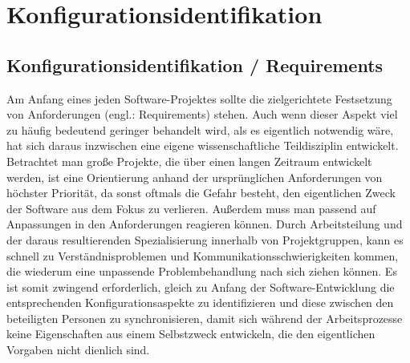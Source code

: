 \chapter{Konfigurationsidentifikation}
\section{Konfigurationsidentifikation / Requirements}
Am Anfang eines jeden Software-Projektes sollte die zielgerichtete Festsetzung von Anforderungen (engl.: Requirements) stehen. Auch wenn dieser Aspekt viel zu häufig bedeutend geringer behandelt wird, als es eigentlich notwendig wäre, hat sich daraus inzwischen eine eigene wissenschaftliche Teildisziplin entwickelt. Betrachtet man große Projekte, die über einen langen Zeitraum entwickelt werden, ist eine Orientierung anhand der ursprünglichen Anforderungen von höchster Priorität, da sonst oftmals die Gefahr besteht, den eigentlichen Zweck der Software aus dem Fokus zu verlieren. Außerdem muss man passend auf Anpassungen in den Anforderungen reagieren können. Durch Arbeitsteilung und der daraus resultierenden Spezialisierung innerhalb von Projektgruppen, kann es schnell zu Verständnisproblemen und Kommunikationsschwierigkeiten kommen, die wiederum eine unpassende Problembehandlung nach sich ziehen können. Es ist somit zwingend erforderlich, gleich zu Anfang der Software-Entwicklung die entsprechenden Konfigurationsaspekte zu identifizieren und diese zwischen den beteiligten Personen zu synchronisieren, damit sich während der Arbeitsprozesse keine Eigenschaften aus einem Selbstzweck entwickeln, die den eigentlichen Vorgaben nicht dienlich sind.
%
